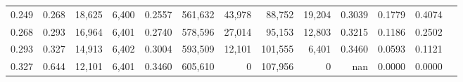 \begin{tabular}{rrrrrrrrrrrrr}
0.249 & 0.268 & 18,625 & 6,400 &                                     0.2557 & 561,632 &  43,978 &  88,752 &  19,204 & 0.3039 & 0.1779 & 0.4074 \\
0.268 & 0.293 & 16,964 & 6,401 &                                     0.2740 & 578,596 &  27,014 &  95,153 &  12,803 & 0.3215 & 0.1186 & 0.2502 \\
0.293 & 0.327 & 14,913 & 6,402 &                                     0.3004 & 593,509 &  12,101 & 101,555 &   6,401 & 0.3460 & 0.0593 & 0.1121 \\
0.327 & 0.644 & 12,101 & 6,401 &                                     0.3460 & 605,610 &       0 & 107,956 &       0 &    nan & 0.0000 & 0.0000 \\
\bottomrule
\end{tabular}
